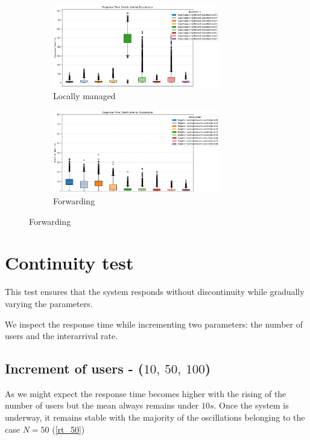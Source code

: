 \documentclass{report}
\begin{document}
\begin{figure}[H]
    \begin{subfigure}{0.60\textwidth}
        \centering
        \includegraphics[width=0.8\textwidth]{img/avg_rt_a.png}
        \caption{Locally managed}
    \end{subfigure}
    \begin{subfigure}{0.60\textwidth}
        \centering
        \includegraphics[width=0.8\textwidth]{img/avg_rt_b.png}
        \caption{Forwarding}
    \end{subfigure}
\end{figure}

\section{Continuity test}
This test ensures that the system responds without discontinuity while gradually varying the parameters.

We inspect the response time while incrementing two parameters: the number of users and the interarrival rate.

\subsection{Increment of users - ($10, \ 50, \ 100$)}\label{nusers}
As we might expect the response time becomes higher with the rising of the number of users but the mean always remains under $10s$. Once the system is underway, it remains stable with the majority of the oscillations belonging to the case $N=50$ (\autoref{rt_50})
\end{document}
